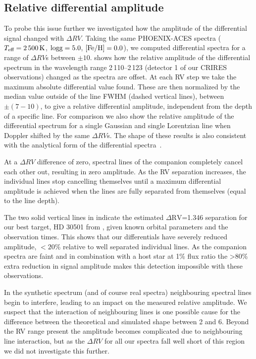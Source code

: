     \subsection{Relative differential amplitude}
    To probe this issue further we investigated how the amplitude of the differential signal changed with \(\Delta {RV}\). Taking the same {PHOENIX-ACES} spectra (\(T_{\textrm{eff}} = 2\,500\,\si{\kelvin}{}\), \(\rm logg=5.0\), \(\rm \feh{}=0.0\)), we computed differential spectra for a range of \(\Delta {RV}\)s between \(\pm10\)\kmps{}.  shows how the relative amplitude of the differential spectrum in the wavelength range 2\,110--2\,123\nm{} (detector 1 of our {CRIRES} observations) changed as the spectra are offset. At each {RV} step we take the maximum absolute differential value found. These are then normalized by the median value outside of the line {FWHM} (dashed vertical lines), between \(\pm(7-10)\)\kmps{}, to give a relative differential amplitude, independent from the depth of a specific line. For comparison we also show the relative amplitude of the differential spectrum for a single Gaussian and single Lorentzian line when Doppler shifted by the same \(\Delta {RV}\)s. The shape of these results is also consistent with the analytical form of the differential spectra~\citet[][eqn.~A.1]{ferluga_separating_1997}.

    At a \(\Delta {RV}\) difference of zero, spectral lines of the companion completely cancel each other out, resulting in zero amplitude. As the {RV} separation increases, the individual lines stop cancelling themselves until a maximum differential amplitude is achieved when the lines are fully separated from themselves (equal to the line depth).

    The two solid vertical lines in  indicate the estimated \(\Delta \textrm{RV}\)=1.346\kmps{} separation for our best target, {HD 30501} from , given known orbital parameters and the observation times. This shows that our differentials have severely reduced amplitude, \(<20\%\) relative to well separated individual lines. As the companion spectra are faint and in combination with a host star at 1\% flux ratio the >80\% extra reduction in signal amplitude makes this detection impossible with these observations.

    In the synthetic spectrum (and of course real spectra) neighbouring spectral lines begin to interfere, leading to an impact on the measured relative amplitude. We suspect that the interaction of neighbouring lines is one possible cause for the difference between the theoretical and simulated shape between 2 and 6\kmps{}. Beyond the {RV} range present the amplitude becomes complicated due to neighbouring line interaction, but as the \(\Delta {RV}\) for all our spectra fall well short of this region we did not investigate this further.


